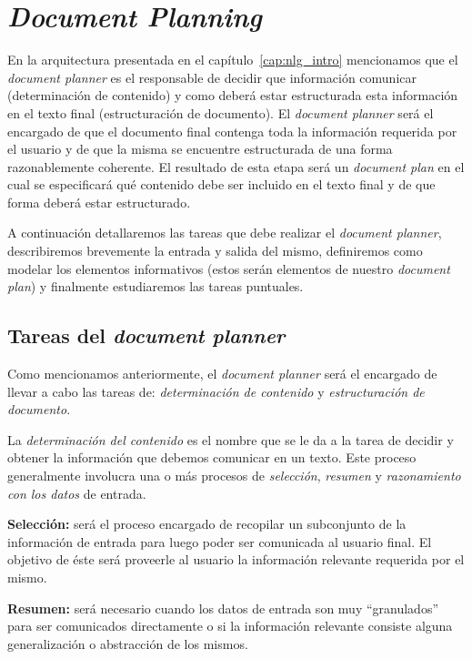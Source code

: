 \chapter{\textit{Document Planning}}
\label{cap:document_planning}

En la arquitectura presentada en el capítulo~\ref{cap:nlg_intro} mencionamos que el \emph{document planner} es el responsable de decidir que información comunicar (determinación de contenido) y como deberá estar estructurada esta información en el texto final (estructuración de documento). El \textit{document planner} será el encargado de que el documento final contenga toda la información requerida por el usuario y de que la misma se encuentre estructurada de una forma razonablemente coherente. El resultado de esta etapa será un \emph{document plan} en el cual se especificará qué contenido debe ser incluido en el texto final y de que forma deberá estar estructurado.


A continuación detallaremos las tareas que debe realizar el \textit{document planner}, describiremos brevemente la entrada y salida del mismo, definiremos como modelar los elementos informativos (estos serán elementos de nuestro \emph{document plan}) y finalmente estudiaremos las tareas puntuales.


\section{Tareas del \textit{document planner}}
Como mencionamos anteriormente, el \textit{document planner} será el encargado de llevar a cabo las tareas de: \emph{determinación de contenido} y \emph{estructuración de documento}.

La \emph{determinación del contenido} es el nombre que se le da a la tarea de decidir y obtener la información que debemos comunicar en un texto. Este proceso generalmente involucra una o más procesos de \emph{selección}, \emph{resumen} y \emph{razonamiento con los datos} de entrada.

\bigskip
\noindent
\textbf{Selección:} será el proceso encargado de recopilar un subconjunto de la información de entrada para luego poder ser comunicada al usuario final. El objetivo de éste será proveerle al usuario la información relevante requerida por el mismo.

\bigskip
\noindent
\textbf{Resumen:} será necesario cuando los datos de entrada son muy ``granulados'' para ser comunicados directamente o si la información relevante consiste alguna generalización o abstracción de los mismos.

